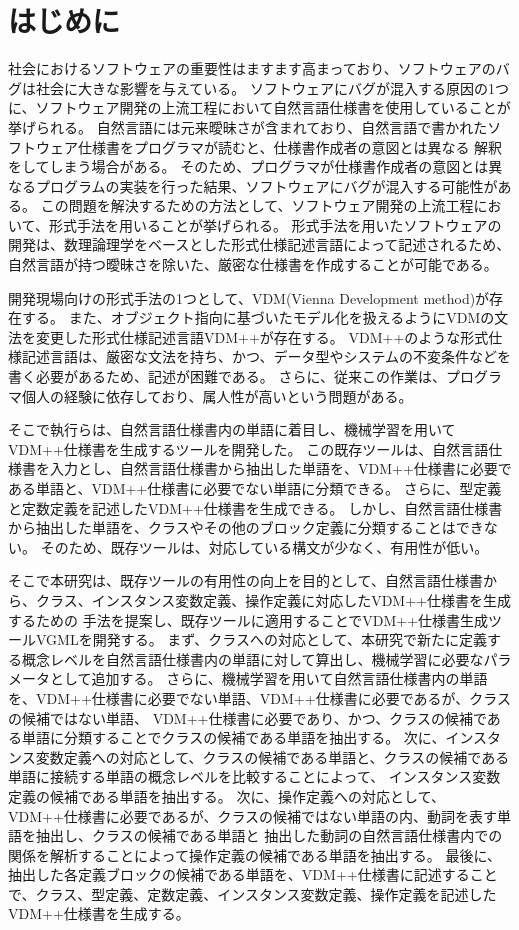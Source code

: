 \chapter{はじめに}
\label{cha:Introduction}

社会におけるソフトウェアの重要性はますます高まっており、ソフトウェアのバグは社会に大きな影響を与えている\cite{cite1,cite2}。
ソフトウェアにバグが混入する原因の1つに、ソフトウェア開発の上流工程において自然言語仕様書を使用していることが挙げられる。
自然言語には元来曖昧さが含まれており、自然言語で書かれたソフトウェア仕様書をプログラマが読むと、仕様書作成者の意図とは異なる
解釈をしてしまう場合がある\cite{cite3}。
そのため、プログラマが仕様書作成者の意図とは異なるプログラムの実装を行った結果、ソフトウェアにバグが混入する可能性がある。
この問題を解決するための方法として、ソフトウェア開発の上流工程において、形式手法を用いることが挙げられる\cite{cite4}。
形式手法を用いたソフトウェアの開発は、数理論理学をベースとした形式仕様記述言語によって記述されるため、
自然言語が持つ曖昧さを除いた、厳密な仕様書を作成することが可能である\cite{cite5}。

開発現場向けの形式手法の1つとして、VDM(Vienna Development method)\cite{vdm}が存在する。
また、オブジェクト指向に基づいたモデル化を扱えるようにVDMの文法を変更した形式仕様記述言語VDM++が存在する\cite{vdm}。
VDM++のような形式仕様記述言語は、厳密な文法を持ち、かつ、データ型やシステムの不変条件などを書く必要があるため、記述が困難である。
さらに、従来この作業は、プログラマ個人の経験に依存しており、属人性が高いという問題がある。

そこで執行らは、自然言語仕様書内の単語に着目し、機械学習を用いてVDM++仕様書を生成するツールを開発した\cite{shityo1,shigyo2,shigyo3,shigyo4}。
この既存ツールは、自然言語仕様書を入力とし、自然言語仕様書から抽出した単語を、VDM++仕様書に必要である単語と、VDM++仕様書に必要でない単語に分類できる。
さらに、型定義と定数定義を記述したVDM++仕様書を生成できる。
しかし、自然言語仕様書から抽出した単語を、クラスやその他のブロック定義に分類することはできない。
そのため、既存ツールは、対応している構文が少なく、有用性が低い。

そこで本研究は、既存ツールの有用性の向上を目的として、自然言語仕様書から、クラス、インスタンス変数定義、操作定義に対応したVDM++仕様書を生成するための
手法を提案し、既存ツールに適用することでVDM++仕様書生成ツールVGMLを開発する。
まず、クラスへの対応として、本研究で新たに定義する概念レベルを自然言語仕様書内の単語に対して算出し、機械学習に必要なパラメータとして追加する。
さらに、機械学習を用いて自然言語仕様書内の単語を、VDM++仕様書に必要でない単語、VDM++仕様書に必要であるが、クラスの候補ではない単語、
VDM++仕様書に必要であり、かつ、クラスの候補である単語に分類することでクラスの候補である単語を抽出する。
次に、インスタンス変数定義への対応として、クラスの候補である単語と、クラスの候補である単語に接続する単語の概念レベルを比較することによって、
インスタンス変数定義の候補である単語を抽出する。
次に、操作定義への対応として、VDM++仕様書に必要であるが、クラスの候補ではない単語の内、動詞を表す単語を抽出し、クラスの候補である単語と
抽出した動詞の自然言語仕様書内での関係を解析することによって操作定義の候補である単語を抽出する。
最後に、抽出した各定義ブロックの候補である単語を、VDM++仕様書に記述することで、クラス、型定義、定数定義、インスタンス変数定義、操作定義を記述した
VDM++仕様書を生成する。

